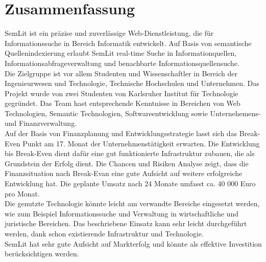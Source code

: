\section{Zusammenfassung}

SemLit ist ein präzise und zuverlässige Web-Dienstleistung, die für Informationssuche in Bereich Informatik entwickelt. Auf Basis von semantische Quellenindexierung erlaubt SemLit real-time Suche in Informationquellen, Informationsabfrageverwaltung und benachbarte Informationsquellensuche.\\
Die Zielgruppe ist vor allem Studenten und Wissenschaftler in Bereich der  Ingenieurwesen und Technologie, Technische Hochschulen und Unternehmen.
Das Projekt wurde von zwei Studenten von Karlsruher Institut für Technologie gegründet. Das Team hast entsprechende Kenntnisse in Bereichen von Web Technologien, Semantic Technologien, Softwareentwicklung sowie Unternehemens- und Finanzverwaltung. \\
Auf der Basis von Finanzplanung und Entwicklungsstrategie lasst sich das Break-Even Punkt am 17. Monat der Unternehmenstätigkeit erwarten. Die Entwicklung bis Break-Even dient dafür eine gut funktionierte Infrastruktur zubauen, die als Grundstein der Erfolg dient. Die Chancen und Risiken Analyse zeigt, dass die Finanzsituation nach Break-Evan eine gute Aufsicht auf weitere erfolgreiche Entwicklung hat. Die geplante Umsatz nach 24 Monate umfasst ca. 40 000 Euro pro Monat.\\
Die genutzte Technologie könnte leicht am verwandte Bereiche eingesetzt werden, wie zum Beispiel Informationssuche und Verwaltung in wirtschaftliche und juristische Bereichen. Das beschriebene Einsatz kann sehr leicht durchgeführt werden, dank schon existierende Infrastruktur und Technologie.\\
SemLit hat sehr gute Aufsicht auf Markterfolg und könnte als effektive Investition berücksichtigen werden. 

